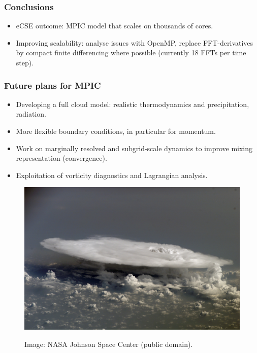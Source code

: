 \documentclass{beamer}
\def\oran#1{\color{orange} #1}
\def\re#1{\color{red}   #1}
\def\bl#1{\color{blue}  #1}
\def\pu#1{\color{purple} #1}
\begin{document}
\begin{frame}
\frametitle{Conclusions}

\begin{itemize}
\item eCSE outcome: MPIC model that scales on thousands of cores.
\item Improving scalability: analyse issues with OpenMP, replace FFT-derivatives by compact finite differencing where possible (currently 18 FFTs per time step).  
\end{itemize}

\end{frame}


\begin{frame}
\frametitle{Future plans for MPIC}

\vspace{0.2cm}
\begin{itemize}
\item Developing a full cloud model: realistic {\bl thermodynamics} and {\bl precipitation}, {\bl  radiation}.
\item More flexible {\pu boundary conditions}, in particular for momentum.
\item Work on {\re marginally resolved and subgrid-scale dynamics} to improve mixing representation (convergence).
\item Exploitation of {\oran vorticity diagnostics} and {\oran Lagrangian analysis}. 
\end{itemize}

\begin{figure}
  \begin{center}
    \includegraphics[scale=0.1]{pmpic_images/Cumulonimbus_cloud_over_Africa.jpg}
  \end{center}
\tiny{Image: NASA Johnson Space Center (public domain).}
\end{figure}

\end{frame}

\end{document}
